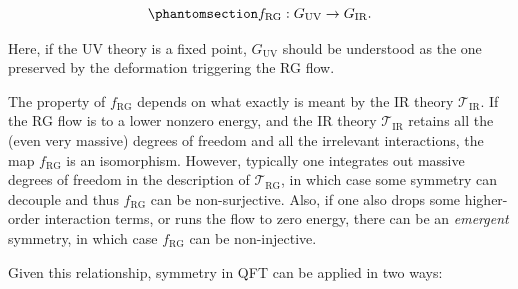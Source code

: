 \documentclass[
  letterpaper,
  DIV=11,
  numbers=noendperiod]{scrreport}
\begin{document}
\begin{tcolorbox}[enhanced jigsaw, arc=.35mm, bottomrule=.15mm, toprule=.15mm, title=\textcolor{quarto-callout-important-color}{\faExclamation}\hspace{0.5em}{RG flow homomorphism from UV symmetry to IR symmetry}, colback=white, opacitybacktitle=0.6, rightrule=.15mm, opacityback=0, breakable, bottomtitle=1mm, titlerule=0mm, leftrule=.75mm, coltitle=black, colframe=quarto-callout-important-color-frame, toptitle=1mm, left=2mm, colbacktitle=quarto-callout-important-color!10!white]

\begin{equation}\phantomsection\label{eq-RG-group-match}{
f_\text{RG} : G_\text{UV} \to G_\text{IR}.
}\end{equation}

\end{tcolorbox}

Here, if the UV theory is a fixed point, \(G_\text{UV}\) should be
understood as the one preserved by the deformation triggering the RG
flow.

\begin{tcolorbox}[enhanced jigsaw, arc=.35mm, bottomrule=.15mm, toprule=.15mm, title=\textcolor{quarto-callout-note-color}{\faInfo}\hspace{0.5em}{Property of \(f_\text{RG}\)}, colback=white, opacitybacktitle=0.6, rightrule=.15mm, opacityback=0, breakable, bottomtitle=1mm, titlerule=0mm, leftrule=.75mm, coltitle=black, colframe=quarto-callout-note-color-frame, toptitle=1mm, left=2mm, colbacktitle=quarto-callout-note-color!10!white]

The property of \(f_\text{RG}\) depends on what exactly is meant by the
IR theory \(\mathcal{T}_\text{IR}\). If the RG flow is to a lower
nonzero energy, and the IR theory \(\mathcal{T}_\text{IR}\) retains all
the (even very massive) degrees of freedom and all the irrelevant
interactions, the map \(f_\text{RG}\) is an isomorphism. However,
typically one integrates out massive degrees of freedom in the
description of \(\mathcal{T}_\text{RG}\), in which case some symmetry
can decouple and thus \(f_\text{RG}\) can be non-surjective. Also, if
one also drops some higher-order interaction terms, or runs the flow to
zero energy, there can be an \emph{emergent} symmetry, in which case
\(f_\text{RG}\) can be non-injective.

\end{tcolorbox}

Given this relationship, symmetry in QFT can be applied in two ways:
\end{document}
